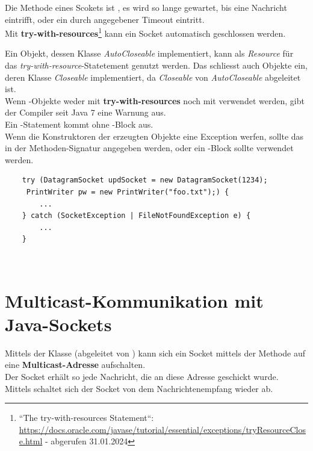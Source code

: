 \noindent
Die Methode  eines Scokets ist , es wird so lange gewartet, bis eine Nachricht eintrifft, oder ein durch  angegebener Timeout eintritt.\\

\noindent
Mit \textbf{try-with-resources}\footnote{
    ``The try-with-resources Statement``: \url{https://docs.oracle.com/javase/tutorial/essential/exceptions/tryResourceClose.html} - abgerufen 31.01.2024
} kann ein Socket automatisch geschlossen werden.

\begin{tcolorbox}
Ein Objekt, dessen Klasse \textit{AutoCloseable} implementiert, kann als \textit{Resource} für das \textit{try-with-resource}-Statetement genutzt werden.
Das schliesst auch Objekte ein, deren Klasse \textit{Closeable} implementiert, da \textit{Closeable} von \textit{AutoCloseable} abgeleitet ist.\\

\noindent
Wenn -Objekte weder mit \textbf{try-with-resources} noch mit  verwendet werden, gibt der Compiler seit Java 7 eine Warnung aus.\\

\noindent
Ein -Statement kommt ohne -Block aus.\\
Wenn die Konstruktoren der erzeugten Objekte eine Exception werfen, sollte das in der Methoden-Signatur angegeben werden, oder ein -Block sollte verwendet werden.
\end{tcolorbox}

\begin{verbatim}
    try (DatagramSocket updSocket = new DatagramSocket(1234);
     PrintWriter pw = new PrintWriter("foo.txt");) {
        ...
    } catch (SocketException | FileNotFoundException e) {
        ...
    }
\end{verbatim}\\

\section{Multicast-Kommunikation mit Java-Sockets}
Mittels der Klasse  (abgeleitet von ) kann sich ein Socket mittels der Methode  auf eine \textbf{Multicast-Adresse} aufschalten.\\
Der Socket erhält so jede Nachricht, die an diese Adresse geschickt wurde.\\
Mittels  schaltet sich der Socket von dem Nachrichtenempfang wieder ab.\\

